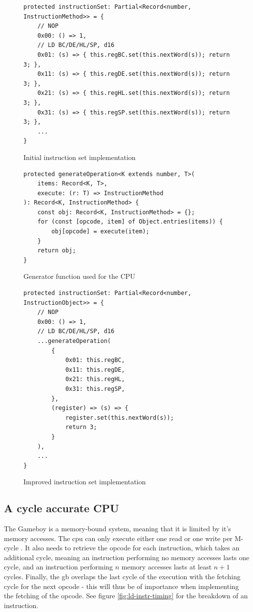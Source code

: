 \documentclass[11pt]{informatics-report}
\begin{document}
\begin{figure}[h]
    \begin{verbatim}
protected instructionSet: Partial<Record<number, InstructionMethod>> = {
    // NOP
    0x00: () => 1,
    // LD BC/DE/HL/SP, d16
    0x01: (s) => { this.regBC.set(this.nextWord(s)); return 3; },
    0x11: (s) => { this.regDE.set(this.nextWord(s)); return 3; },
    0x21: (s) => { this.regHL.set(this.nextWord(s)); return 3; },
    0x31: (s) => { this.regSP.set(this.nextWord(s)); return 3; },
    ...
}
    \end{verbatim}
    \caption{Initial instruction set implementation}
    \label{fig:instset-first}
\end{figure}

\begin{figure}[h]
    \begin{verbatim}
protected generateOperation<K extends number, T>(
    items: Record<K, T>,
    execute: (r: T) => InstructionMethod
): Record<K, InstructionMethod> {
    const obj: Record<K, InstructionMethod> = {};
    for (const [opcode, item] of Object.entries(items)) {
        obj[opcode] = execute(item);
    }
    return obj;
}
    \end{verbatim}
    \caption{Generator function used for the CPU}
    \label{fig:cpu-gen-function}
\end{figure}

\begin{figure}[h]
    \begin{verbatim}
protected instructionSet: Partial<Record<number, InstructionObject>> = {
    // NOP
    0x00: () => 1,
    // LD BC/DE/HL/SP, d16
    ...generateOperation(
        {
            0x01: this.regBC,
            0x11: this.regDE,
            0x21: this.regHL,
            0x31: this.regSP,
        },
        (register) => (s) => {
            register.set(this.nextWord(s));
            return 3;
        }
    ),
    ...
}
    \end{verbatim}
    \caption{Improved instruction set implementation}
    \label{fig:instset-second}
\end{figure}

\subsection{A cycle accurate CPU}

The Gameboy is a memory-bound system, meaning that it is limited by it's memory accesses. The \gls{cpu} can only execute either one read or one write per M-cycle \cite[CPU core timing]{gbctr}. It also needs to retrieve the opcode for each instruction, which takes an additional cycle, meaning an instruction performing no memory accesses lasts one cycle, and an instruction performing $n$ memory accesses lasts at least $n + 1$ cycles. Finally, the \gls{gb} overlaps the last cycle of the execution with the fetching cycle for the next opcode - this will thus be of importance when implementing the fetching of the opcode. See figure \ref{fig:ld-instr-timing} for the breakdown of an instruction.
\end{document}
